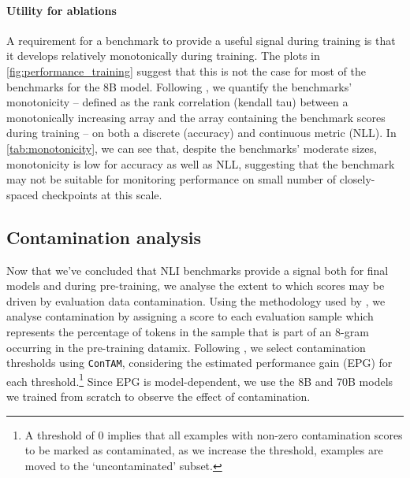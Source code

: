 \paragraph{Utility for ablations}
A requirement for a benchmark to provide a useful signal during training is that it develops relatively monotonically during training.
The plots in \cref{fig:performance_training} suggest that this is not the case for most of the benchmarks for the 8B model.
Following \citet{variancepaper}, we quantify the benchmarks' monotonicity -- defined as the rank correlation (kendall tau) between a monotonically increasing array and the array containing the benchmark scores during training -- on both a discrete (accuracy) and continuous metric (NLL). %
In \cref{tab:monotonicity}, we can see that, despite the benchmarks' moderate sizes, monotonicity is low for accuracy as well as NLL, suggesting that the benchmark may not be suitable for monitoring performance on small number of closely-spaced checkpoints at this scale. %


\subsection{Contamination analysis}\label{subsec:contamination}

Now that we've concluded that NLI benchmarks provide a signal both for final models and during pre-training, we analyse the extent to which scores may be driven by evaluation data contamination.
Using the methodology used by \citet{dubey2024llama}, we analyse contamination by assigning a score to each evaluation sample which represents the percentage of tokens in the sample that is part of an 8-gram occurring in the pre-training datamix.
Following \citet{}, we select contamination thresholds using \texttt{ConTAM}, considering the estimated performance gain (EPG) for each threshold.\footnote{A threshold of 0 implies that all examples with non-zero contamination scores to be marked as contaminated, as we increase the threshold, examples are moved to the `uncontaminated' subset.}
Since EPG is model-dependent, we use the 8B and 70B models we trained from scratch to observe the effect of contamination.

